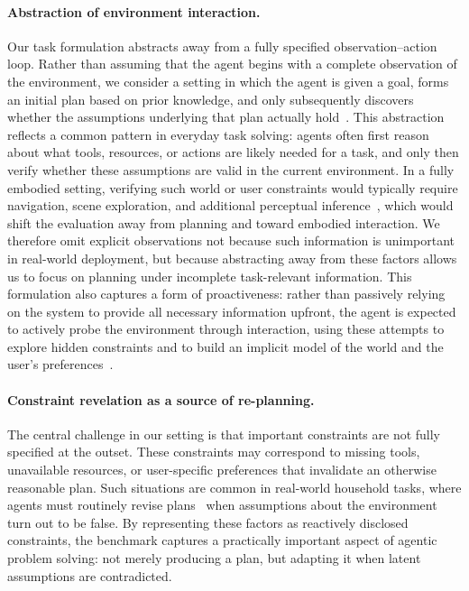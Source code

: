 \paragraph{Abstraction of environment interaction.}
Our task formulation abstracts away from a fully specified observation--action loop. Rather than assuming that the agent begins with a complete observation of the environment, we consider a setting in which the agent is given a goal, forms an initial plan based on prior knowledge, and only subsequently discovers whether the assumptions underlying that plan actually hold~\citep{HANHEIDE2017119,pmlr-v87-nyga18a}. 
This abstraction reflects a common pattern in everyday task solving: agents often first reason about what tools, resources, or actions are likely needed for a task, and only then verify whether these assumptions are valid in the current environment. In a fully embodied setting, verifying such world or user constraints would typically require navigation, scene exploration, and additional perceptual inference~\citep{shridhar2020alfredbenchmarkinterpretinggrounded,kim2024realfredembodiedinstructionfollowing,liu2026naacl}, which would shift the evaluation away from planning and toward embodied interaction. We therefore omit explicit observations not because such information is unimportant in real-world deployment, but because abstracting away from these factors allows us to focus on planning under incomplete task-relevant information. This formulation also captures a form of proactiveness: rather than passively relying on the system to provide all necessary information upfront, the agent is expected to actively probe the environment through interaction, using these attempts to explore hidden constraints and to build an implicit model of the world and the user's preferences~\citep{narcomey2024learninghumanpreferencesrobot,sadigh2016information}.

\paragraph{Constraint revelation as a source of re-planning.}
The central challenge in our setting is that important constraints are not fully specified at the outset. 
These constraints may correspond to missing tools, unavailable resources, or user-specific preferences that invalidate an otherwise reasonable plan. 
Such situations are common in real-world household tasks, where agents must routinely revise plans~\citep{costbench} when assumptions about the environment turn out to be false. By representing these factors as reactively disclosed constraints, the benchmark captures a practically important aspect of agentic problem solving: not merely producing a plan, but adapting it when latent assumptions are contradicted.

